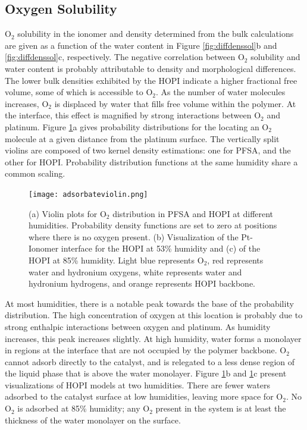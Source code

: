 \documentclass[journal=jacsat,manuscript=article]{achemso}
\begin{document}
\subsection{Oxygen Solubility}
O$_2$ solubility in the ionomer and density determined from the bulk calculations are given as a function of the water content in Figure \ref{fig:diffdenssol}b and \ref{fig:diffdenssol}c, respectively. The negative correlation between O$_2$ solubility and water content is probably attributable to density and morphological differences. The lower bulk densities exhibited by the HOPI indicate a higher fractional free volume, some of which is accessible to O$_2$. As the number of water molecules increases, O$_2$ is displaced by water that fills free volume within the polymer. At the interface, this effect is magnified by strong interactions between O$_2$ and platinum. Figure \ref{fig:violin-plots}a gives probability distributions for the locating an O$_2$ molecule at a given distance from the platinum surface. The vertically split violins are composed of two kernel density estimations: one for PFSA, and the other for HOPI.  Probability distribution functions at the same humidity share a common scaling. 

\begin{figure}[h!]
  \texttt{[image: adsorbateviolin.png]}
  \centering
  \caption{(a) Violin plots for O$_2$ distribution in PFSA and HOPI at different humidities. Probability density functions are set to zero at positions where there is no oxygen present. (b) Visualization of the Pt-Ionomer interface for the HOPI at 53\% humidity and (c) of the HOPI at 85\% humidity. Light blue represents O$_2$, red represents water and hydronium oxygens, white represents water and hydronium hydrogens, and orange represents HOPI backbone.}
    \label{fig:violin-plots}
\end{figure}

At most humidities, there is a notable peak towards the base of the probability distribution. The high concentration of oxygen at this location is probably due to strong enthalpic interactions between oxygen and platinum. As humidity increases, this peak increases slightly. At high humidity, water forms a monolayer in regions at the interface that are not occupied by the polymer backbone. O$_2$ cannot adsorb directly to the catalyst, and is relegated to a less dense region of the liquid phase that is above the water monolayer. Figure \ref{fig:violin-plots}b and \ref{fig:violin-plots}c present visualizations of HOPI models at two humidities. There are fewer waters adsorbed to the catalyst surface at low humidities, leaving more space for O$_2$. No O$_2$ is adsorbed at 85\% humidity; any O$_2$ present in the system is at least the thickness of the water monolayer on the surface. 
\end{document}
